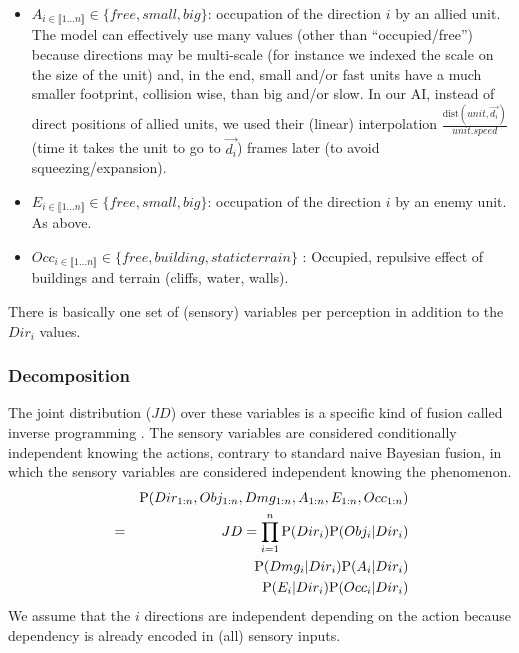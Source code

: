 \begin{itemize}
\item $A_{i \in \llbracket 1 \dots n\rrbracket } \in \{free, small, big\}$: occupation of the direction $i$ by an allied unit. The model can effectively use many values (other than ``occupied/free'') because directions may be multi-scale (for instance we indexed the scale on the size of the unit) and, in the end, small and/or fast units have a much smaller footprint, collision wise, than big and/or slow. In our AI, instead of direct positions of allied units, we used their (linear) interpolation $\frac{\mathrm{dist}(unit, \vec{d_i})}{unit.speed}$ (time it takes the unit to go to $\vec{d_i}$) 
frames later (to avoid squeezing/expansion).

\item $E_{i \in \llbracket 1 \dots n\rrbracket } \in \{free, small, big\}$: occupation of the direction $i$ by an enemy unit. As above.

\item $Occ_{i \in \llbracket 1 \dots n\rrbracket } \in \{free, building, staticterrain\}$%
: Occupied, repulsive effect of buildings and terrain (cliffs, water, walls).
\end{itemize}

There is basically one set of (sensory) variables per perception in addition to the $Dir_i$ values. 

\subsubsection{Decomposition}

The joint distribution ($JD$) over these variables is a specific kind of fusion called inverse programming \citep{LeHy04}. The sensory variables are considered conditionally independent knowing the actions, contrary to standard naive Bayesian fusion, in which the sensory variables are considered independent knowing the phenomenon.
\begin{eqnarray}
&& \mathrm{P}(Dir_{1:n}, Obj_{1:n}, Dmg_{1:n}, A_{1:n}, E_{1:n}, Occ_{1:n})\\
& = & JD = \prod_{i=1}^{n} \mathrm{P}(Dir_i) \mathrm{P}(Obj_i | Dir_i) \\
                    && \mathrm{P}(Dmg_i | Dir_i) \mathrm{P}(A_i | Dir_i) \\
                    && \mathrm{P}(E_i | Dir_i) \mathrm{P}(Occ_i | Dir_i)
\end{eqnarray}
We assume that the $i$ directions are independent depending on the action because dependency is already encoded in (all) sensory inputs. 

